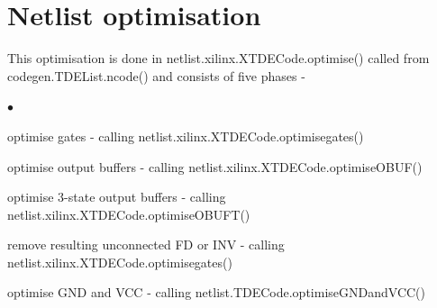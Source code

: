 \documentclass[10pt,a4paper,twoside,fleqn]{book}
\newcommand{\blist}{\begin{list}{$\bullet$}{\setlength{\itemsep}{-5pt}\setlength{\topsep}{-5pt}}}
\newcommand{\blend}{\end{list}}
\begin{document}
    \section{Netlist optimisation}
    
        This optimisation is done in netlist.xilinx.XTDECode.optimise() called
        from codegen.TDEList.ncode() and consists of five phases -
        
        \blist
        \item   optimise gates - calling netlist.xilinx.XTDECode.optimisegates()
        \item   optimise output buffers - calling
                netlist.xilinx.XTDECode.optimiseOBUF()
        \item   optimise 3-state output buffers - calling
                netlist.xilinx.XTDECode.optimiseOBUFT()
        \item   remove resulting unconnected FD or INV - calling
                netlist.xilinx.XTDECode.optimisegates() 
        \item   optimise GND and VCC - calling
                netlist.TDECode.optimiseGNDandVCC()
        \blend
        
\end{document}
